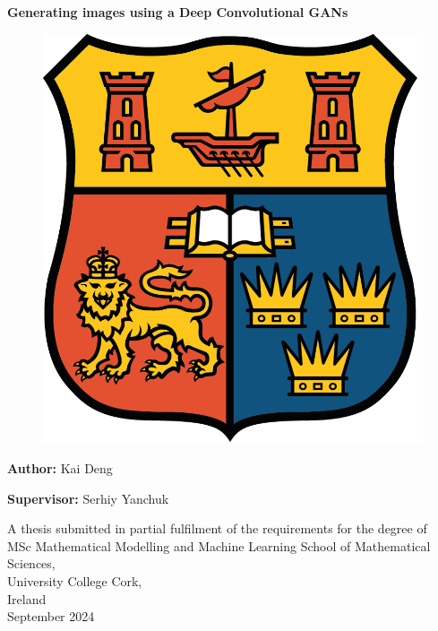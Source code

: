 \documentclass[12pt,a4paper]{report}
\begin{document}
\begin{titlepage} \vspace{1cm}

\begin{center}
\textbf{\Huge Generating images using a Deep Convolutional GANs}
\end{center}

\vspace{1.0cm}

\begin{figure}[h]
    \centering
    \includegraphics[scale = 0.7]{Images/UCC_logo} 
\end{figure}

\vspace{1.0cm}

\begin{center}
\textbf{\Large Author:} \Large{Kai Deng} {\LARGE\par}
\textbf{\Large Supervisor:} \Large{Serhiy Yanchuk} {\LARGE\par}
\end{center}
\vspace{1.0cm}

\begin{center}
\Large
A thesis submitted in partial fulfilment of the requirements for the degree of\\ MSc Mathematical Modelling and Machine Learning
\vfill{}
\Large{School of Mathematical Sciences, \\
University College Cork, \\
Ireland \\
\vspace{0.4cm}
September 2024}
\end{center}

\end{titlepage}
\end{document}
